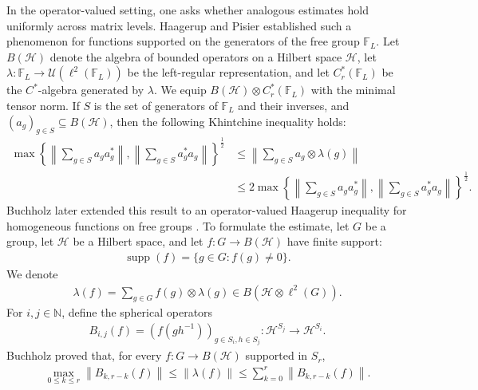 \documentclass[12pt,reqno]{amsart}
\newcommand{\N}{\mathbb{N}}
\newcommand{\norm}[1]{\left\|#1\right\|}
\newcommand{\Hil}{\mathcal{H}}
\numberwithin{equation}{section}
\begin{document}
In the operator-valued setting, one asks whether analogous estimates hold uniformly across matrix levels. Haagerup and Pisier \cite{HaagerupPisier1993operatorspace} established such a phenomenon for functions supported on the generators of the free group $\mathbb{F}_L$. Let $B(\Hil)$ denote the algebra of bounded operators on a Hilbert space $\Hil$, let $\lambda:\mathbb{F}_L\to \mathcal{U}(\ell^2(\mathbb{F}_L))$ be the left-regular representation, and let $C_r^*(\mathbb{F}_L)$ be the $C^*$-algebra generated by $\lambda$. We equip $B(\Hil)\otimes C_r^*(\mathbb{F}_L)$ with the minimal tensor norm. If $S$ is the set of generators of $\mathbb{F}_L$ and their inverses, and $(a_g)_{g\in S}\subseteq B(\Hil)$, then the following Khintchine inequality holds:
\begin{align*}
    \max \left\{\norm{\sum_{g\in S}a_ga_g^*},\norm{\sum_{g\in S}a_g^*a_g}\right\}^{\frac{1}{2}}
    &\le \norm{\sum_{g\in S}a_g\otimes \lambda(g)}\\
    &\le 2\max \left\{\norm{\sum_{g\in S}a_ga_g^*},\norm{\sum_{g\in S}a_g^*a_g}\right\}^{\frac{1}{2}}.
\end{align*}
Buchholz later extended this result to an operator-valued Haagerup inequality for homogeneous functions on free groups \cite{Buchholz1999OVfree}. To formulate the estimate, let $G$ be a group, let $\Hil$ be a Hilbert space, and let $f:G\to B(\Hil)$ have finite support:
\begin{align*}
    \operatorname{supp}(f)=\{g\in G: f(g)\ne 0\}.
\end{align*}
We denote
\begin{align}\label{equation: lambda(f)}
    \lambda(f)=\sum_{g\in G}f(g)\otimes \lambda(g)\in B(\Hil\otimes \ell^2(G)).
\end{align}
For $i,j\in \N$, define the spherical operators
\begin{align*}
    B_{i,j}(f)=(f(gh^{-1}))_{g\in S_i, h\in S_j}: \Hil^{S_j} \to \Hil^{S_i}.
\end{align*}
Buchholz proved that, for every $f:G\to B(\Hil)$ supported in $S_r$,
\begin{align*}
    \max_{0\le k\le r}\norm{B_{k,r-k}(f)}\le \norm{\lambda(f)}\le \sum_{k=0}^r \norm{B_{k,r-k}(f)}.
\end{align*}
\end{document}
